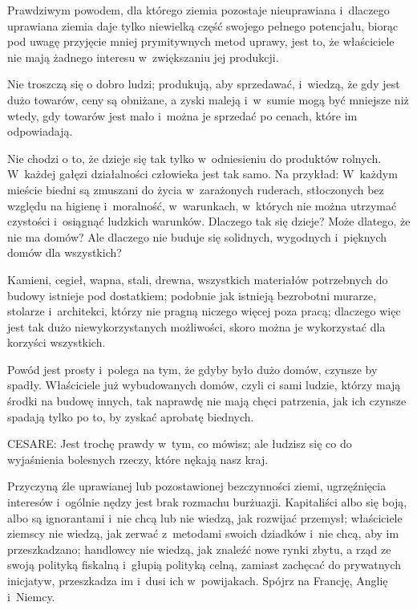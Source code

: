 \documentclass[oneside,polish,11pt,sfheadings]{mwbk}
\begin{document}
 
Prawdziwym powodem, dla którego ziemia pozostaje nieuprawiana i~dlaczego uprawiana ziemia daje tylko niewielką część
swojego pełnego potencjału, biorąc pod uwagę przyjęcie mniej prymitywnych metod uprawy, jest to, że właściciele nie
mają żadnego interesu w~zwiększaniu jej produkcji. 

 
Nie troszczą się o dobro ludzi; produkują, aby sprzedawać, i~wiedzą, że gdy jest dużo towarów, ceny są obniżane, a zyski
maleją i~w~sumie mogą być mniejsze niż wtedy, gdy towarów jest mało i~można je sprzedać po cenach, które im
odpowiadają. 

 
Nie chodzi o to, że dzieje się tak tylko w~odniesieniu do produktów rolnych. W~każdej gałęzi działalności człowieka jest
tak samo. Na przykład: W~każdym mieście biedni są zmuszani do życia w~zarażonych ruderach, stłoczonych bez względu na
higienę i~moralność, w~warunkach, w~których nie można utrzymać czystości i~osiągnąć ludzkich warunków. Dlaczego tak się
dzieje? Może dlatego, że nie ma domów? Ale dlaczego nie buduje się solidnych, wygodnych i~pięknych domów dla
wszystkich? 

 
Kamieni, cegieł, wapna, stali, drewna, wszystkich materiałów potrzebnych do budowy istnieje pod dostatkiem; podobnie jak
istnieją bezrobotni murarze, stolarze i~architekci, którzy nie pragną niczego więcej poza pracą; dlaczego więc jest tak
dużo niewykorzystanych możliwości, skoro można je wykorzystać dla korzyści wszystkich. 

 
Powód jest prosty i~polega na tym, że gdyby było dużo domów, czynsze by spadły. Właściciele już wybudowanych domów,
czyli ci sami ludzie, którzy mają środki na budowę innych, tak naprawdę nie mają chęci patrzenia, jak ich czynsze
spadają tylko po to, by zyskać aprobatę biednych. 




 
\noindent CESARE: Jest trochę prawdy w~tym, co mówisz; ale łudzisz się co do wyjaśnienia bolesnych rzeczy, które nękają nasz
kraj. 

 
Przyczyną źle uprawianej lub pozostawionej bezczynności ziemi, ugrzęźnięcia interesów i~ogólnie nędzy jest brak rozmachu
burżuazji. Kapitaliści albo się boją, albo są ignorantami i~nie chcą lub nie wiedzą, jak rozwijać przemysł; właściciele
ziemscy nie wiedzą, jak zerwać z~metodami swoich dziadków i~nie chcą, aby im przeszkadzano; handlowcy nie wiedzą, jak
znaleźć nowe rynki zbytu, a rząd ze swoją polityką fiskalną i~głupią polityką celną,  zamiast zachęcać do prywatnych
inicjatyw, przeszkadza im i~dusi ich w~powijakach. Spójrz na Francję, Anglię i~Niemcy. 
\end{document}
